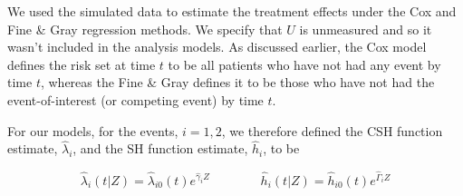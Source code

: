 \documentclass[12pt,PhD,twoside,openright]{muthesis}
\begin{document}
We used the simulated data to estimate the treatment effects under the Cox and Fine \& Gray regression methods. We specify that \(U\) is unmeasured and so it wasn't included in the analysis models. As discussed earlier, the Cox model defines the risk set at time \(t\) to be all patients who have not had any event by time \(t\), whereas the Fine \& Gray defines it to be those who have not had the event-of-interest (or competing event) by time \(t\).

For our models, for the events, \(i={1,2}\), we therefore defined the CSH function estimate, \(\hat{\lambda}_i\), and the SH function estimate, \(\hat{h}_i\), to be

\[
\hat{\lambda}_i(t|Z) = \hat{\lambda}_{i0}(t)e^{\hat{\gamma}_iZ} \qquad\qquad 
\hat{h}_i(t|Z) = \hat{h}_{i0}(t)e^{\hat{\Gamma}_iZ}
\]
\end{document}
